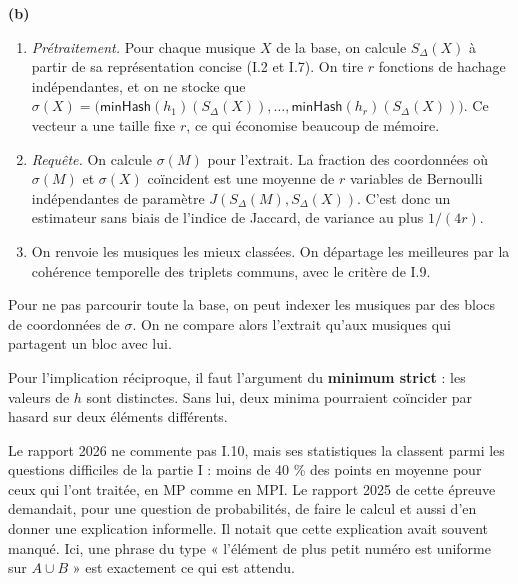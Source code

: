 \documentclass[11pt,a4paper]{article}
\providecommand{\tightlist}{\setlength{\itemsep}{0pt}\setlength{\parskip}{0pt}}
\newcommand{\equationajustee}[1]{%
  \sbox{\boiteequation}{$\displaystyle #1$}%
  \ifdim\wd\boiteequation>\linewidth
    \[\resizebox{\linewidth}{!}{\usebox{\boiteequation}}\]%
  \else
    \[#1\]%
  \fi}
\begin{document}
\equationajustee{\boxed{\begin{aligned}
\Pr\big(\mathsf{minHash}(h)(A)=\mathsf{minHash}(h)(B)\big)&=\frac{|A\cap B|}{|A\cup B|}\\
&=J(A,B).
\end{aligned}}}

\textbf{(b)}

\begin{enumerate}
\def\labelenumi{\arabic{enumi}.}
\tightlist
\item
  \emph{Prétraitement.} Pour chaque musique \(X\) de la base, on calcule \(S_\Delta(X)\) à partir de sa représentation concise (I.2 et I.7). On tire \(r\) fonctions de hachage indépendantes, et on ne stocke que \(\sigma(X)=\big(\mathsf{minHash}(h_1)(S_\Delta(X)),\allowbreak \dots,\allowbreak \mathsf{minHash}(h_r)(S_\Delta(X))\big)\). Ce vecteur a une taille fixe \(r\), ce qui économise beaucoup de mémoire.
\item
  \emph{Requête.} On calcule \(\sigma(M)\) pour l'extrait. La fraction des coordonnées où \(\sigma(M)\) et \(\sigma(X)\) coïncident est une moyenne de \(r\) variables de Bernoulli indépendantes de paramètre \(J(S_\Delta(M),S_\Delta(X))\). C'est donc un estimateur sans biais de l'indice de Jaccard, de variance au plus \(1/(4r)\).
\item
  On renvoie les musiques les mieux classées. On départage les meilleures par la cohérence temporelle des triplets communs, avec le critère de I.9.
\end{enumerate}

Pour ne pas parcourir toute la base, on peut indexer les musiques par des blocs de coordonnées de \(\sigma\). On ne compare alors l'extrait qu'aux musiques qui partagent un bloc avec lui.

\begin{piege}

Pour l'implication réciproque, il faut l'argument du \textbf{minimum strict} : les valeurs de \(h\) sont distinctes. Sans lui, deux minima pourraient coïncider par hasard sur deux éléments différents.

\end{piege}

\begin{jury}

Le rapport 2026 ne commente pas I.10, mais ses statistiques la classent parmi les questions difficiles de la partie I : moins de 40 \% des points en moyenne pour ceux qui l'ont traitée, en MP comme en MPI. Le rapport 2025 de cette épreuve demandait, pour une question de probabilités, de faire le calcul et aussi d'en donner une explication informelle. Il notait que cette explication avait souvent manqué. Ici, une phrase du type « l'élément de plus petit numéro est uniforme sur \(A\cup B\) » est exactement ce qui est attendu.

\end{jury}
\end{document}
